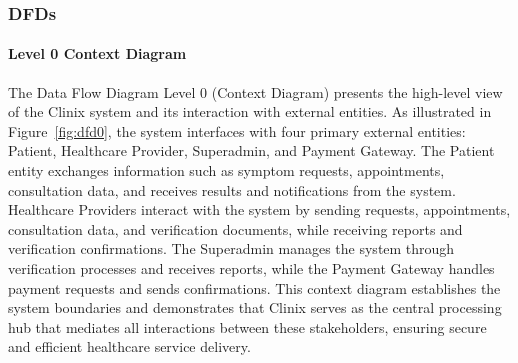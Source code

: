 \subsubsection*{DFDs}

\paragraph{Level 0 Context Diagram}
The Data Flow Diagram Level 0 (Context Diagram) presents the high-level view of the Clinix system and its interaction with external entities. As illustrated in Figure~\ref{fig:dfd0}, the system interfaces with four primary external entities: Patient, Healthcare Provider, Superadmin, and Payment Gateway. The Patient entity exchanges information such as symptom requests, appointments, consultation data, and receives results and notifications from the system. Healthcare Providers interact with the system by sending requests, appointments, consultation data, and verification documents, while receiving reports and verification confirmations. The Superadmin manages the system through verification processes and receives reports, while the Payment Gateway handles payment requests and sends confirmations. This context diagram establishes the system boundaries and demonstrates that Clinix serves as the central processing hub that mediates all interactions between these stakeholders, ensuring secure and efficient healthcare service delivery.

